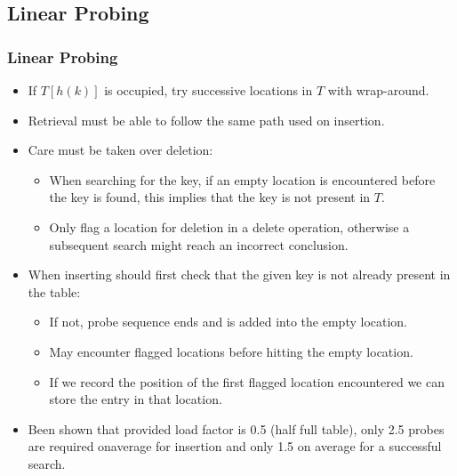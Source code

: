 \documentclass{beamer}
\begin{document}
\subsection{Linear Probing}
\begin{frame}
\frametitle{Linear Probing}
\begin{itemize}
\item If $T[h(k)]$ is occupied, try successive locations in $T$ with wrap-around.
\item Retrieval must be able to follow the same path used on insertion.
\item Care must be taken over deletion:
\begin{itemize}
\item When searching for the key, if an empty location is encountered before the key is found, this implies that the key is not present in $T$.
\item Only flag a location for deletion in a delete operation, otherwise a subsequent search might reach an incorrect conclusion.
\end{itemize}
\item When inserting should first check that the given key is not already present in the table:
\begin{itemize}
\item If not, {\color{red}probe sequence} ends and is added into the empty location.
\item May encounter flagged locations before hitting the empty location.
\item If we record the position of the first flagged location encountered we can store the entry in that location.
\end{itemize}
\item Been shown that provided load factor is 0.5 (half full table), only 2.5 probes are required onaverage for insertion and only 1.5 on average for a successful search.
\end{itemize}
\end{frame}
\end{document}
